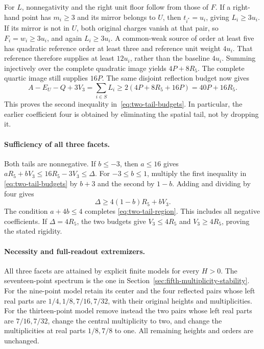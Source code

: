 For \(L\), nonnegativity and the right unit floor follow from those of
\(F\). If a right-hand point has \(m_i\ge3\) and its mirror belongs to
\(U\), then \(t_{i^*}=u_i\), giving \(L_i\ge3u_i\).
If its mirror is not in \(U\), both original charges vanish at that
pair, so \(F_i=w_i\ge3u_i\), and again \(L_i\ge3u_i\).
A common-weak source of order at least five has quadratic reference
order at least three and reference unit weight \(4u_i\).
That reference therefore supplies at least \(12u_i\), rather than
the baseline \(4u_i\). Summing injectively over the complete quadratic
image yields \(4P+8R_5\). The complete quartic image still supplies
\(16P\). The same disjoint reflection budget now gives
\[
 A-E_U-Q+3V_3=\sum_{i\in S}L_i
 \ge2(4P+8R_5+16P)=40P+16R_5.
\]
This proves the second inequality in~\eqref{eq:two-tail-budgets}.
In particular, the earlier coefficient four is obtained by eliminating
the spatial tail, not by dropping it.

\paragraph{Sufficiency of all three facets.}
Both tails are nonnegative. If \(b\le-3\), then \(a\le16\) gives
\(aR_5+bV_3\le16R_5-3V_3\le\Delta\).
For \(-3\le b\le1\), multiply the first inequality in
\eqref{eq:two-tail-budgets} by \(b+3\) and the second by \(1-b\).
Adding and dividing by four gives
\[
 \Delta\ge4(1-b)R_5+bV_3.
\]
The condition \(a+4b\le4\) completes
\eqref{eq:two-tail-region}. This includes all negative coefficients.
If \(\Delta=4R_5\), the two budgets give
\(V_3\le4R_5\) and \(V_3\ge4R_5\), proving the stated rigidity.

\paragraph{Necessity and full-readout extremizers.}
All three facets are attained by explicit finite models for every \(H>0\).
The seventeen-point spectrum is the one in
Section~\ref{sec:fifth-multiplicity-stability}.
For the nine-point model retain its center and the four reflected pairs
whose left real parts are \(1/4,1/8,7/16,7/32\), with their original
heights and multiplicities. For the thirteen-point model remove instead
the two pairs whose left real parts are \(7/16,7/32\), change the central
multiplicity to two, and change the multiplicities at real parts
\(1/8,7/8\) to one. All remaining heights and orders are unchanged.

